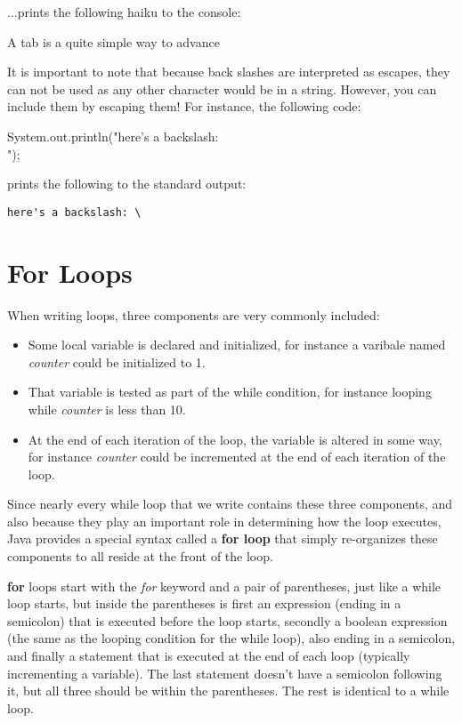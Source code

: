 ...prints the following haiku to the console:

\begin{code}
A tab is
	a quite simple way
		to advance
\end{code}

It is important to note that because back slashes are interpreted as escapes, they can not be used as any other character would be in a string. However, you can include them by escaping them! For instance, the following code:

\begin{code}
System.out.println("here's a backslash: \\");
\end{code}

prints the following to the standard output:

\begin{verbatim}
here's a backslash: \
\end{verbatim}


\section{For Loops}

When writing loops, three components are very commonly included: 
\begin{itemize}
\item Some local variable is declared and initialized, for instance a varibale named \textit{counter} could be initialized to 1. 
\item That variable is tested as part of the while condition, for instance looping while \textit{counter} is less than 10. 
\item At the end of each iteration of the loop, the variable is altered in some way, for instance \textit{counter} could be incremented at the end of each iteration of the loop. 
\end{itemize}

Since nearly every while loop that we write contains these three components, and also because they play an important role in determining how the loop executes, Java provides a special syntax called a \textbf{for loop} that simply re-organizes these components to all reside at the front of the loop. 

\textbf{for} loops start with the \textit{for} keyword and a pair of parentheses, just like a while loop starts, but inside the parentheses is first an expression (ending in a semicolon) that is executed before the loop starts, secondly a boolean expression (the same as the looping condition for the while loop), also ending in a semicolon, and finally a statement that is executed at the end of each loop (typically incrementing a variable). The last statement doesn't have a semicolon following it, but all three should be within the parentheses. The rest is identical to a while loop. 

